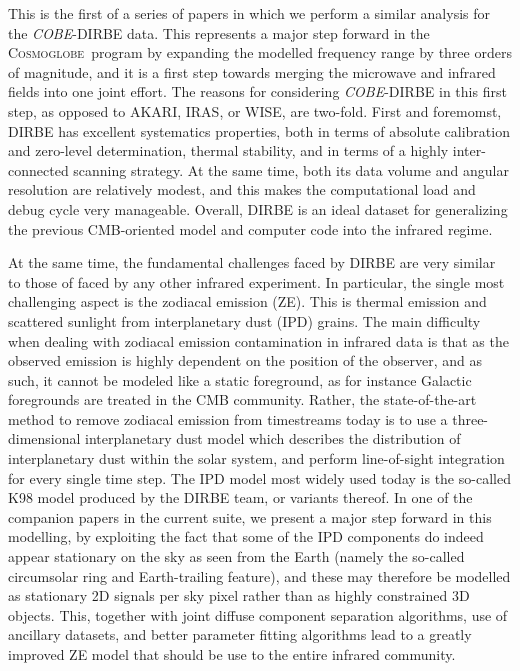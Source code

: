 \documentclass{aa}
\def\Cosmoglobe{\textsc{Cosmoglobe}}
\def\COBE{\textit{COBE}}
\begin{document}
This is the first of a series of papers in which we perform a similar analysis for the \COBE-DIRBE data. This represents a major step forward in the \Cosmoglobe\ program by expanding the modelled frequency range by three orders of magnitude, and it is a first step towards merging the microwave and infrared fields into one joint effort. The reasons for considering \COBE-DIRBE in this first step, as opposed to AKARI, IRAS, or WISE, are two-fold. First and foremomst, DIRBE has excellent systematics properties, both in terms of absolute calibration and zero-level determination, thermal stability, and in terms of a highly inter-connected scanning strategy. At the same time, both its data volume and angular resolution are relatively modest, and this makes the computational load and debug cycle very manageable. Overall, DIRBE is an ideal dataset for generalizing the previous CMB-oriented model and computer code into the infrared regime.

At the same time, the fundamental challenges faced by DIRBE are very similar to those of faced by any other infrared experiment. In particular, the single most challenging aspect is the zodiacal emission (ZE). This is thermal emission and scattered sunlight from interplanetary dust (IPD) grains. The main difficulty when dealing with zodiacal emission contamination in infrared data is that as the observed emission is highly dependent on the position of the observer, and as such, it cannot be modeled like a static foreground, as for instance Galactic foregrounds are treated in the CMB community. Rather, the state-of-the-art method to remove zodiacal emission from timestreams today is to use a three-dimensional interplanetary dust model which describes the distribution of interplanetary dust within the solar system, and perform line-of-sight integration for every single time step. The IPD model most widely used today is the so-called K98 model \citep{kelsall1998} produced by the DIRBE team, or variants thereof. In one of the companion papers in the current suite, we present a major step forward in this modelling, by exploiting the fact that some of the IPD components do indeed appear stationary on the sky as seen from the Earth (namely the so-called circumsolar ring and Earth-trailing feature), and these may therefore be modelled as stationary 2D signals per sky pixel rather than as highly constrained 3D objects. This, together with joint diffuse component separation algorithms, use of ancillary datasets, and better parameter fitting algorithms lead to a greatly improved ZE model that should be use to the entire infrared community.
\end{document}
